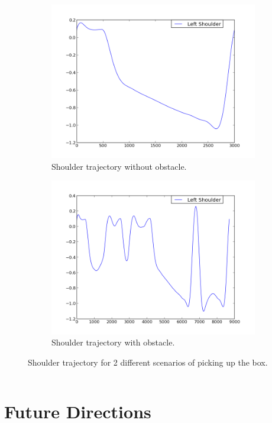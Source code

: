 \documentclass[a4paper]{article}
\begin{document}
\begin{figure}
\centering
\begin{subfigure}{.5\textwidth}
  \centering
  \includegraphics[width=.8\linewidth]{left_shoulder_normal.png}
  \caption{Shoulder trajectory without obstacle.}
  \label{shoulder_normal}
\end{subfigure}%
\begin{subfigure}{.5\textwidth}
  \centering
  \includegraphics[width=.8\linewidth]{left_shoulder_blocked.png}
  \caption{Shoulder trajectory with obstacle.}
  \label{shoulder_block}
\end{subfigure}
\caption{Shoulder trajectory for 2 different scenarios of picking up the box.}
\label{ubot_should}
\end{figure}

$$$$$$$$

\section{Future Directions}
\end{document}
